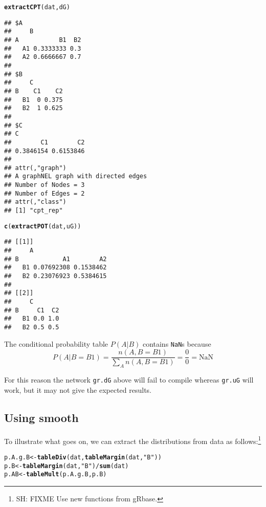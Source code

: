 \documentclass[10pt]{article}\usepackage[]{graphicx}\usepackage[]{color}
\makeatletter
\newcommand{\hlstr}[1]{\textcolor[rgb]{0.192,0.494,0.8}{#1}}%
\newcommand{\hlopt}[1]{\textcolor[rgb]{0,0,0}{#1}}%
\newcommand{\hlstd}[1]{\textcolor[rgb]{0.345,0.345,0.345}{#1}}%
\newcommand{\hlkwb}[1]{\textcolor[rgb]{0.69,0.353,0.396}{#1}}%
\newcommand{\hlkwd}[1]{\textcolor[rgb]{0.737,0.353,0.396}{\textbf{#1}}}%
\newenvironment{kframe}{%
 \def\at@end@of@kframe{}%
 \ifinner\ifhmode%
  \def\at@end@of@kframe{\end{minipage}}%
  \begin{minipage}{\columnwidth}%
 \fi\fi%
 \def\FrameCommand##1{\hskip\@totalleftmargin \hskip-\fboxsep
 \colorbox{shadecolor}{##1}\hskip-\fboxsep
     \hskip-\linewidth \hskip-\@totalleftmargin \hskip\columnwidth}%
 \MakeFramed {\advance\hsize-\width
   \@totalleftmargin\z@ \linewidth\hsize
   \@setminipage}}%
 {\par\unskip\endMakeFramed%
 \at@end@of@kframe}
\newenvironment{knitrout}{}{} %
\def\code#1{{\texttt{#1}}}
\makeatother
\begin{document}
\begin{knitrout}
\color{fgcolor}\begin{kframe}
\begin{alltt}
\hlkwd{extractCPT}\hlstd{(dat, dG)}
\end{alltt}
\begin{verbatim}
## $A
##     B
## A           B1  B2
##   A1 0.3333333 0.3
##   A2 0.6666667 0.7
## 
## $B
##     C
## B    C1    C2
##   B1  0 0.375
##   B2  1 0.625
## 
## $C
## C
##        C1        C2 
## 0.3846154 0.6153846 
## 
## attr(,"graph")
## A graphNEL graph with directed edges
## Number of Nodes = 3 
## Number of Edges = 2 
## attr(,"class")
## [1] "cpt_rep"
\end{verbatim}
\begin{alltt}
\hlkwd{c}\hlstd{(}\hlkwd{extractPOT}\hlstd{(dat, uG ))}
\end{alltt}
\begin{verbatim}
## [[1]]
##     A
## B            A1        A2
##   B1 0.07692308 0.1538462
##   B2 0.23076923 0.5384615
## 
## [[2]]
##     C
## B     C1  C2
##   B1 0.0 1.0
##   B2 0.5 0.5
\end{verbatim}
\end{kframe}
\end{knitrout}

The conditional probability table $P(A|B)$ contains \code{NaN}s
because
\begin{displaymath}
  P(A|B=B1)=\frac{n(A,B=B1)}{\sum_A n(A,B=B1)} = \frac{0}{0} = \mbox{NaN}
\end{displaymath}

For this reason the network \code{gr.dG} above will fail to compile
whereas \code{gr.uG} will work, but it may not give the expected results.

\subsection{Using smooth}
\label{sec:using-smooth}

To illustrate what goes on, we can extract the distributions from data
as follows:\footnote{SH: FIXME Use new functions from gRbase.}

\begin{knitrout}
\color{fgcolor}\begin{kframe}
\begin{alltt}
\hlstd{p.A.g.B} \hlkwb{<-} \hlkwd{tableDiv}\hlstd{(dat,} \hlkwd{tableMargin}\hlstd{(dat,} \hlstr{"B"}\hlstd{))}
\hlstd{p.B}     \hlkwb{<-} \hlkwd{tableMargin}\hlstd{(dat,} \hlstr{"B"}\hlstd{)} \hlopt{/} \hlkwd{sum}\hlstd{(dat)}
\hlstd{p.AB}    \hlkwb{<-} \hlkwd{tableMult}\hlstd{( p.A.g.B, p.B)}
\end{alltt}
\end{kframe}
\end{knitrout}
\end{document}
